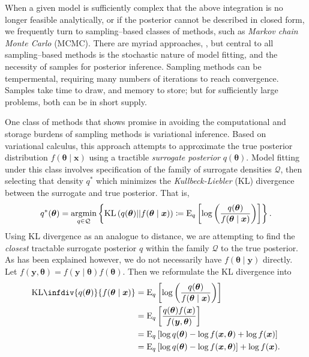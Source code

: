 When a given model is sufficiently complex that the above integration is no
    longer feasible analytically, or if the posterior cannot be described in
    closed form, we frequently 
    turn to sampling--based classes of methods, such as 
    \emph{Markov chain Monte Carlo} (MCMC)\needcite. There are myriad approaches, 
    , but central to all sampling--based 
    methods is the stochastic nature of model fitting, and the 
    necessity of samples for posterior inference.  Sampling methods can be 
    tempermental, requiring many numbers of iterations to reach convergence.
    Samples take time to draw, and memory to store; but for sufficiently large 
    problems, both can be in short supply.

One class of methods that shows promise in avoiding the computational and 
    storage burdens of sampling methods is variational inference.\needcite 
    Based on variational calculus, this approach attempts to approximate the 
    true posterior distribution
    $f(\bm{\theta}\mid\bm{x})$ using a tractible \emph{surrogate posterior} 
    $q(\bm{\theta})$.  Model fitting under this class involves specification of 
    the family of surrogate densities $\mathcal{Q}$, then selecting that density 
    $q^*$ which minimizes the \emph{Kullbeck-Liebler} (KL) divergence between 
    the surrogate and true posterior.  That is,
    \begin{equation}
        \label{eqn:optimalq}
        q^*(\bm{\theta}) = \operatorname*{argmin}_{q\in\mathcal{Q}}\left\lbrace
        \text{KL}\left(q(\bm{\theta})||f(\bm{\theta}\mid\bm{x})\right) 
        \coloneqq
        \text{E}_{q}\left[\log\left(
        \frac{q(\bm{\theta})}{f(\bm{\theta}\mid\bm{x})}
        \right)\right]
        \right\rbrace.
    \end{equation}
    Using KL divergence as an analogue to distance, we are attempting to find
    the \emph{closest} tractable surrogate posterior $q$ within the family 
    $\mathcal{Q}$ to the true posterior.
    As has been explained however, we do not necessarily have 
    $f(\bm{\theta}\mid\bm{y})$ directly.  Let 
    $f(\bm{y},\bm{\theta}) = f(\bm{y}\mid\bm{\theta})f(\bm{\theta})$.
    Then we reformulate the KL divergence into
    \[
        \begin{aligned}
        \text{KL}\infdiv{q(\bm{\theta})}{f(\bm{\theta}\mid\bm{x})}
            &=\text{E}_{q}\left[\log\left(
                \frac{q(\bm{\theta})}{f(\bm{\theta}\mid\bm{x})}
                \right)\right]\\
            &= \text{E}_{q}\left[
                \frac{q(\bm{\theta})f(\bm{x})}{f(\bm{y},\bm{\theta})}
                \right]\\
            &= \text{E}_{q}\left[
                \log q(\bm{\theta}) - \log f(\bm{x},\bm{\theta}) 
                + \log f(\bm{x})
                \right]\\
            &= \text{E}_{q}\left[
                \log q(\bm{\theta}) - \log f(\bm{x},\bm{\theta})\right] + 
                   \log f(\bm{x}).
        \end{aligned}
    \]
